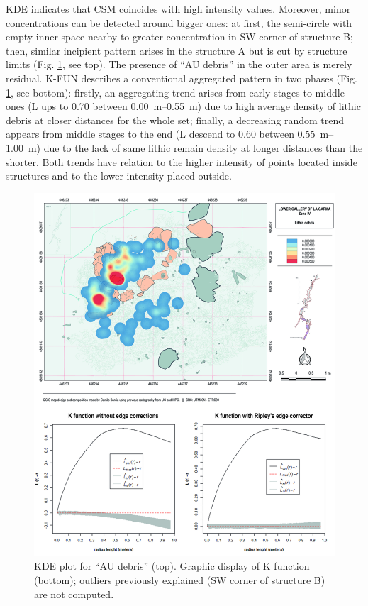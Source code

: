 KDE indicates that CSM coincides with high intensity values. Moreover, minor concentrations can be detected around bigger ones: at first, the semi-circle with empty inner space nearby to greater concentration in SW corner of structure B; then, similar incipient pattern arises in the structure A but is cut by structure limits (Fig. \ref{fig:Garcia_Fig4}, see top). The presence of “AU debris” in the outer area is merely residual. K-FUN describes a conventional aggregated pattern in two phases (Fig. \ref{fig:Garcia_Fig4}, see bottom): firstly, an aggregating trend arises from early stages to middle ones (L ups to 0.70 between \SIrange{0.00}{0.55}{\metre}) due to high average density of lithic debris at closer distances for the whole set; finally, a decreasing random trend appears from middle stages to the end (L descend to 0.60 between \SIrange{0.55}{1.00}{\metre}) due to the lack of same lithic remain density at longer distances than the shorter. Both trends have relation to the higher intensity of points located inside structures and to the lower intensity placed outside.

\begin{figure}
	\includegraphics[width=\linewidth]{figures/garcia_Fig4}
	\centering
	\caption{KDE plot for “AU debris” (top). Graphic display of K function (bottom); outliers previously explained (SW corner of structure B) are not computed.}
	\label{fig:Garcia_Fig4}
\end{figure}

